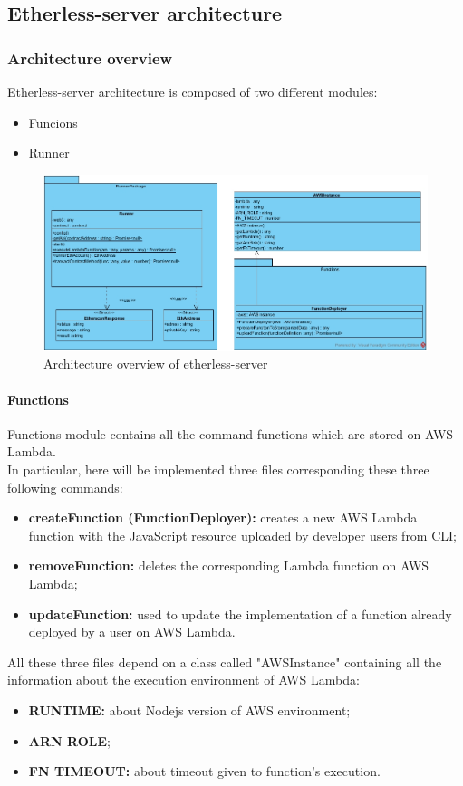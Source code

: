 \subsection{Etherless-server architecture}
\subsubsection{Architecture overview}
Etherless-server architecture is composed of two different modules:
\begin{itemize}
	\item Funcions
	\item Runner
\end{itemize}
\begin{figure}[!h]
\centering
	\includegraphics[width=\textwidth]{res/img/etherlessServer.jpg}
	\caption{Architecture overview of etherless-server}
\end{figure}
\paragraph{Functions}
Functions module contains all the command functions which are stored on AWS Lambda. \\
In particular, here will be implemented three files corresponding these three following commands:
\begin{itemize}
	\item \textbf{createFunction (FunctionDeployer):} creates a new AWS Lambda function with the JavaScript resource uploaded by developer users from CLI\glo;
	\item \textbf{removeFunction:} deletes the corresponding Lambda function on AWS Lambda;
	\item \textbf{updateFunction:} used to update the implementation of a function already deployed by a user on AWS Lambda.
\end{itemize}
All these three files depend on a class called "AWSInstance" containing all the information about the execution environment of AWS Lambda:
\begin{itemize}
	\item \textbf{RUNTIME:} about Nodejs version of AWS environment;
	\item \textbf{ARN ROLE};
	\item \textbf{FN TIMEOUT:} about timeout given to function's execution.
\end{itemize}

